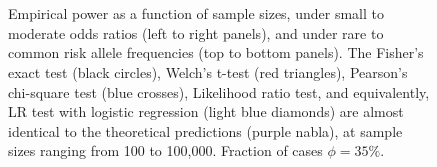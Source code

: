 \begin{figure}[!tpb]
{        }\\ %
        \\ %
\caption{Empirical power as a function of sample sizes, under small to moderate odds ratios (left to right panels), and under rare to common risk allele frequencies (top to bottom panels).
The Fisher's exact test (black circles), Welch's t-test (red triangles), Pearson's chi-square test (blue crosses), Likelihood ratio test, and equivalently, LR test with logistic regression (light blue diamonds) are almost identical to the theoretical predictions (purple nabla), at sample sizes ranging from 100 to 100,000. Fraction of cases $\phi = 35\%$.
}\label{fig:compare-phi035}
\end{figure}


